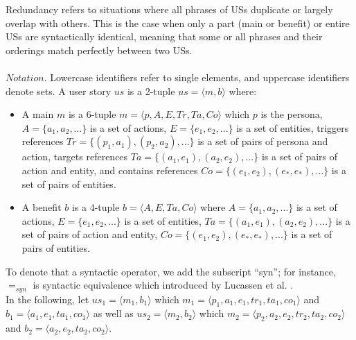 \begin{definition}
	Redundancy refers to situations where all phrases of USs duplicate or largely overlap with others. This is the case when only a part (main or benefit) or entire USs are syntactically identical, meaning that some or all phrases and their orderings match perfectly between two USs. \\\\
	$Notation$. Lowercase identifiers refer to single elements, and uppercase identifiers denote sets. A user story $us$ is a 2-tuple $us = \langle m,b\rangle $ where:
	\begin{itemize}
		\item A main $m$ is a 6-tuple $m = \langle p,A,E,Tr,Ta,Co\rangle $ which $p$ is the persona, $A = \{ a_1,a_2,...\} $ is a set of actions, $E = \{e_1,e_2,...\}$ is a set of entities, triggers references $Tr = \{(p_1,a_1),(p_2,a_2),...\}$ is a set of pairs of persona and action, targets references $Ta = \{(a_1,e_1),(a_2,e_2),...\}$ is a set of pairs of action and entity, and contains references $Co = \{ (e_1,e_2),(e_*,e_*),... \}$ is a set of pairs of entities.
		
		\item A benefit $b$ is a 4-tuple $b = \langle A,E,Ta,Co\rangle $ where $A = \{ a_1,a_2,...\} $ is a set of actions, $E = \{e_1,e_2,...\}$ is a set of entities,  $Ta = \{(a_1,e_1),(a_2,e_2),...\}$ is a set of pairs of action and entity, $Co = \{ (e_1,e_2),(e_*,e_*),... \}$ is a set of pairs of entities.
	\end{itemize}
	To denote that a syntactic operator, we add the subscript
	“syn”; for instance, $=_{syn}$ is syntactic equivalence which introduced by Lucassen et al. \cite{lucassen2016improving}.\\ In the following, let $us_1 = \langle m_1,b_1\rangle $ which $m_1 = \langle p_1,a_1,e_1,tr_1,ta_1,co_1 \rangle$ and $b_1 = \langle a_1,e_1,ta_1,co_1 \rangle$ as well as $us_2 = \langle m_2,b_2\rangle$ which $m_2 = \langle p_2,a_2,e_2,tr_2,ta_2,co_2 \rangle$ and $b_2 = \langle a_2,e_2,ta_2,co_2 \rangle$.
	

\end{definition}

